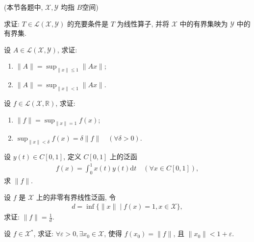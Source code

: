 \documentclass[../../main.tex]{subfiles}%
\begin{document}
(本节各题中, $\mathscr{X},\mathscr{Y}$ 均指 $B$空间)

\begin{example}
求证: $T \in \mathscr{L}(\mathscr{X},\mathscr{Y})$ 的充要条件是 $T$ 为线性算子, 并将 $\mathscr{X}$ 中的有界集映为 $\mathscr{Y}$ 中的有界集.
\end{example}

\begin{example}
设 $A \in \mathscr{L}(\mathscr{X},\mathscr{Y})$, 求证:
\begin{enumerate}[(1)]
\item $\|A\| = \sup_{\|x\| \leqslant 1} \|Ax\|$;
\item $\|A\| = \sup_{\|x\| < 1} \|Ax\|$.
\end{enumerate}
\end{example}

\begin{example}
设 $f \in \mathscr{L}(\mathscr{X},\mathbb{R})$, 求证:
\begin{enumerate}[(1)]
\item $\|f\| = \sup_{\|x\| = 1} f(x)$;
\item $\sup_{\|x\| < \delta} f(x) = \delta\|f\| \quad (\forall \delta > 0)$.
\end{enumerate}
\end{example}

\begin{example}
设 $y(t) \in C[0,1]$, 定义 $C[0,1]$ 上的泛函
\begin{align*}
f(x) = \int_{0}^{1} x(t)y(t) \mathrm{d}t \quad (\forall x \in C[0,1]),
\end{align*}
求 $\|f\|$.
\end{example}

\begin{example}
设 $f$ 是 $\mathscr{X}$ 上的非零有界线性泛函, 令
\begin{align*}
d = \inf \{\|x\| \mid f(x) = 1, x \in \mathscr{X}\},
\end{align*}
求证: $\|f\| = \frac{1}{d}$.
\end{example}

\begin{example}
设 $f \in \mathscr{X}^*$, 求证: $\forall \varepsilon > 0, \exists x_0 \in \mathscr{X}$, 使得 $f(x_0) = \|f\|$, 且 $\|x_0\| < 1 + \varepsilon$.
\end{example}
\end{document}
